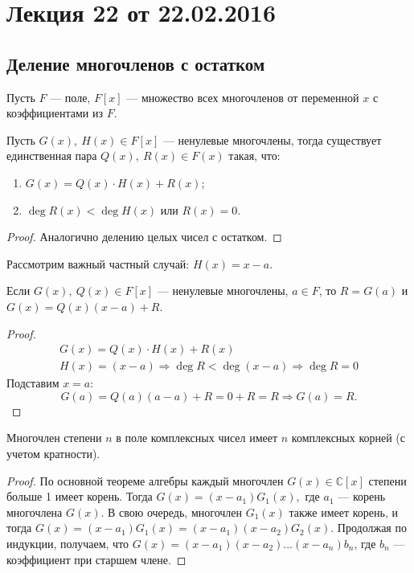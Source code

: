 \section{Лекция 22 от 22.02.2016}

\subsection*{Деление многочленов с остатком}

Пусть $F$ --- поле, $F[x]$ --- множество всех многочленов от переменной $x$ с коэффициентами из $F$.
\begin{Theorem}
	Пусть $G(x),\ H(x) \in F[x]$ --- ненулевые многочлены, тогда существует единственная пара $Q(x),\ R(x) \in F(x)$ такая, что:
	\begin{enumerate}
		\item $G(x) = Q(x)\cdot H(x) + R(x)$;
		\item $\deg  R(x) < \deg  H(x)$ или $R(x) = 0$.
	\end{enumerate}
\end{Theorem}

\begin{proof}
Аналогично делению целых чисел с остатком.
\end{proof}

Рассмотрим важный частный случай: $H(x) = x - a$. 

\begin{Theorem}[Безу]
	Если $G(x),\ Q(x) \in F[x]$ --- ненулевые многочлены, $a \in F$, то $R = G(a)$ и $G(x) = Q(x)(x - a) + R$.
\end{Theorem}

\begin{proof}
\begin{gather*}
	G(x) = Q(x)\cdot H(x) + R(x) \\
	H(x) = (x - a) \Rightarrow \deg R < \deg (x - a) \Rightarrow \deg R = 0
\end{gather*}
	Подставим $x = a$:
	$$G(a) = Q(a)(a-a) + R = 0 + R = R \Rightarrow G(a) = R.$$
\end{proof}

\begin{Theorem}
	Многочлен степени $n$ в поле комплексных чисел имеет $n$ комплексных корней (с учетом кратности).
\end{Theorem}

\begin{proof}
	По основной теореме алгебры каждый многочлен $G(x) \in \mathbb{C}[x]$ степени больше 1 имеет корень. Тогда $G(x) = (x - a_1)G_1(x),$ где $a_1$ --- корень многочлена $G(x)$. В свою очередь, многочлен $G_1(x)$ также имеет корень, и тогда $G(x) = (x - a_1)G_1(x) = (x - a_1)(x - a_2)G_2(x)$. Продолжая по индукции, получаем, что $G(x) = (x - a_1)(x - a_2)\ldots(x - a_n)b_n$, где $b_n$ --- коэффициент при старшем члене.
\end{proof}

